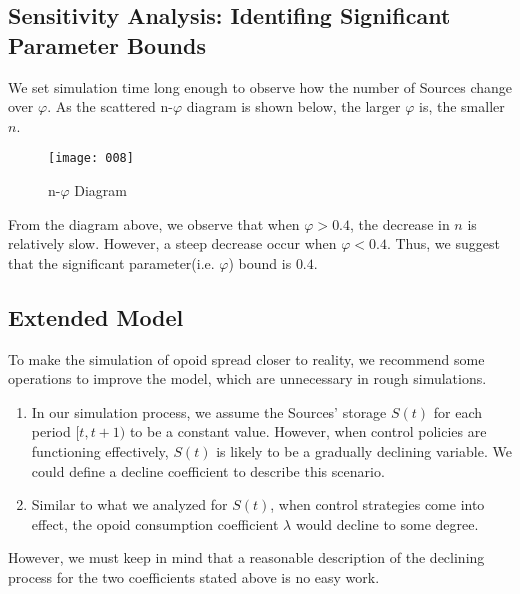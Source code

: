 	


\subsection{Sensitivity Analysis: Identifing Significant Parameter Bounds}

We set simulation time long enough to observe how the number of Sources 
change over $\varphi$. As the scattered n-$\varphi$ diagram is shown below, the larger $\varphi$ is, the smaller $n$.

\begin{figure}[H]
	\centering
	\texttt{[image: 008]}
	\caption{n-$\varphi$ Diagram}
\end{figure}

From the diagram above, we observe that when $\varphi > 0.4$, the decrease in $n$ is relatively slow. However, a steep decrease occur when $\varphi < 0.4$. Thus, we suggest that the significant parameter(i.e. $\varphi$) bound is $0.4$.

\subsection{Extended Model}
To make the simulation of opoid spread closer to reality, we recommend some operations to improve the model, which are unnecessary in rough simulations.
\begin{enumerate}
	\item In our simulation process, we assume the Sources' storage $S(t)$ for each period $[t,t+1)$ to be a constant value. However, when control policies are functioning effectively, $S(t)$ is likely to be a gradually declining variable. We could define a decline coefficient to describe this scenario.
	
	\item Similar to what we analyzed for $S(t)$, when control strategies come into effect, the opoid consumption coefficient $\lambda$ would decline to some degree.
\end{enumerate}

However, we must keep in mind that a reasonable description of the declining process for the two coefficients stated above is no easy work.
